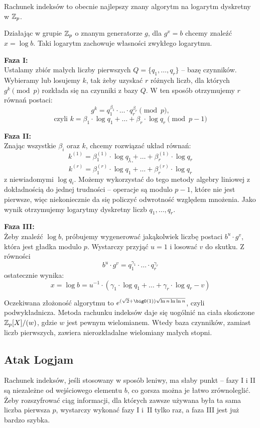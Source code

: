 Rachunek indeksów to obecnie najlepszy znany algorytm na logarytm dyskretny w \( \mathbb{Z}_p \).

Działając w grupie \( \mathbb{Z}_p \) o znanym generatorze \( g \), dla \( g^x = b \) chcemy znaleźć \( x = \log b \). Taki logarytm zachowuje własności zwykłego logarytmu.

\textbf{Faza I:} \\
Ustalamy zbiór małych liczby pierwszych \( Q = \{q_1, \dots, q_r\} \) -- bazę czynników.
Wybieramy lub losujemy \( k \), tak żeby uzyskać \( r \) różnych liczb, dla których \( g^k \pmod{p} \) rozkłada się na czynniki z bazy \( Q \). W ten sposób otrzymujemy \( r \) równań postaci:
\[
	g^k = q_1^{\beta_1} \cdot \ldots \cdot q_r^{\beta_r} \pmod{p},
\]
\[
	\text{czyli } k = \beta_1 \cdot \log q_1 + \ldots + \beta_r \cdot \log q_r \pmod{p - 1}
\]

\textbf{Faza II:} \\
Znając wszystkie \( \beta_i \) oraz \( k \), chcemy rozwiązać układ równań:
\[
	k^{(1)} = \beta_1^{(1)} \cdot \log q_1 + \ldots + \beta_r^{(1)} \cdot \log q_r
\]
\[
	\cdots
\]
\[
	k^{(r)} = \beta_1^{(r)} \cdot \log q_1 + \ldots + \beta_r^{(r)} \cdot \log q_r
\]
z niewiadomymi \( \log q_i \). Możemy wykorzystać do tego metody algebry liniowej z dokładnością do jednej trudności -- operacje są modulo \( p-1 \), które nie jest pierwsze, więc niekoniecznie da się policzyć odwrotność względem mnożenia.
Jako wynik otrzymujemy logarytmy dyskretny liczb \( q_1, \dots, q_r \).

\textbf{Faza III:} \\
Żeby znaleźć \( \log b \), próbujemy wygenerować jakąkolwiek liczbę postaci \( b^u \cdot g^v \), która jest gładka modulo \( p \). Wystarczy przyjąć \( u = 1 \) i losować \( v \) do skutku. Z równości
\[ b^u \cdot g^v = q_1^{\gamma_1} \cdot \ldots \cdot q_r^{\gamma_r} \]
ostatecznie wynika:
\[ x = \log b = u^{-1} \cdot (\gamma_1 \cdot \log q_1 + \ldots + \gamma_r \cdot \log q_r - v) \]

Oczekiwana złożoność algorytmu to \( e^{(\sqrt{2}+\bigO(1))\sqrt{\ln n \ln\ln n}} \), czyli podwykładnicza. Metoda rachunku indeksów daje się uogólnić na ciała skończone \( \mathbb{Z}_p[X]/(w) \), gdzie \( w \) jest pewnym wielomianem. Wtedy baza czynników, zamiast liczb pierwszych, zawiera nierozkładalne wielomiany małych stopni.

\subsection{Atak Logjam}
Rachunek indeksów, jeśli stosowany w sposób leniwy, ma słaby punkt -- fazy I i II są niezależne od wejściowego elementu \( b \), co gorsza można je łatwo zrównoleglić.
Żeby rozszyfrować ciąg informacji, dla których zawsze używana była ta sama liczba pierwsza \( p \), wystarczy wykonać fazy I i~II tylko raz, a faza III jest już bardzo szybka.

